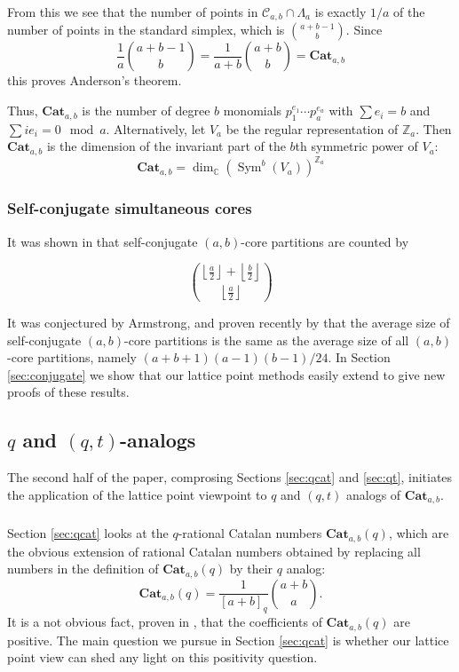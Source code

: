 \documentclass{amsart}[12pt]
\theoremstyle{definition}
\newcommand{\Z}{\mathbb{Z}}
\newcommand{\C}{\mathbb{C}}
\newcommand{\Cat}{\mathbf{Cat}}
\DeclareMathOperator{\Sym}{Sym}
\begin{document}
From this we see that the number of points in $\mathcal{C}_{a,b}\cap \Lambda_a$ is exactly $1/a$ of the number of points in the standard simplex, which is $\binom{a+b-1}{b}$.  Since $$\frac{1}{a}\binom{a+b-1}{b}=\frac{1}{a+b}\binom{a+b}{b}=
\Cat_{a,b}$$
this proves Anderson's theorem.

Thus, $\Cat_{a,b}$ is the number of degree $b$ monomials $p_1^{e_1}\cdots p_a^{e_a}$ with $\sum e_i=b$ and $\sum i e_i=0\mod a$.  Alternatively, let $V_a$ be the regular representation of $\Z_a$.  Then $\Cat_{a,b}$ is the dimension of the invariant part of the $b$th symmetric power of $V_a$: 
\begin{equation} \label{eq:invariant}
\Cat_{a,b}=\dim_\C \left(\Sym^b(V_a)\right)^{\Z_a}
\end{equation}


\subsubsection{Self-conjugate simultaneous cores}
It was shown in \cite{FMS} that self-conjugate $(a,b)$-core partitions are counted by 

$$\binom{\left\lfloor \frac{a}{2} \right\rfloor +\left\lfloor \frac{b}{2} \right\rfloor}{\left\lfloor \frac{a}{2} \right\rfloor}$$

It was conjectured by Armstrong, and proven recently by \cite{CHW} that the average size of self-conjugate $(a,b)$-core partitions is the same as the average size of all $(a,b)$-core partitions, namely $(a+b+1)(a-1)(b-1)/24$.  In Section \ref{sec:conjugate} we show that our lattice point methods easily extend to give new proofs of these results.

\subsection{\texorpdfstring{$q$}{q} and \texorpdfstring{$(q,t)$}{(q,t)}-analogs}

The second half of the paper, comprosing Sections \ref{sec:qcat} and \ref{sec:qt}, initiates the application of the lattice point viewpoint to $q$ and $(q,t)$ analogs of $\Cat_{a,b}$.   



\subsubsection{}
Section \ref{sec:qcat} looks at the $q$-rational Catalan numbers $\Cat_{a,b}(q)$, which are the obvious extension of rational Catalan numbers obtained by replacing all numbers in the definition of $\Cat_{a,b}(q)$ by their $q$ analog:
$$\Cat_{a,b}(q)=\frac{1}{[a+b]_q}\binom{a+b}{a}.$$
It is a not obvious fact, proven in  , that the coefficients of $\Cat_{a,b}(q)$ are positive.  The main question we pursue in Section \ref{sec:qcat} is whether our lattice point view can shed any light on this positivity question.
\end{document}
